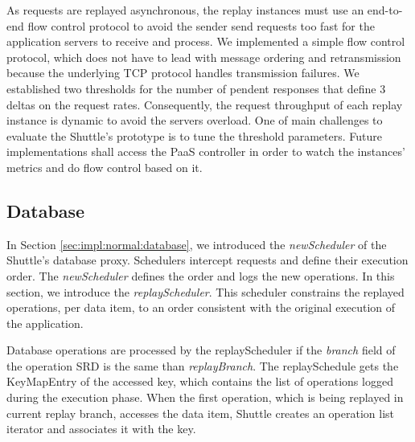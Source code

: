 


As requests are replayed asynchronous, the replay instances must use an end-to-end flow control protocol to avoid the sender send requests too fast for the application servers to receive and process. We implemented a simple flow control protocol, which does not have to lead with message ordering and retransmission because the underlying \ac{TCP} protocol handles transmission failures. We established two thresholds for the number of pendent responses that define 3 deltas on the request rates. Consequently, the request throughput of each replay instance is dynamic to avoid the servers overload. One of main challenges to evaluate the Shuttle's prototype is to tune the threshold parameters. Future implementations shall access the \ac{PaaS} controller in order to watch the instances' metrics and do flow control based on it.\\


\subsection{Database}\label{sec:impl:recovery:database}
In Section \ref{sec:impl:normal:database}, we introduced the \emph{newScheduler} of the Shuttle's database proxy. Schedulers intercept requests and define their execution order. The \emph{newScheduler} defines the order and logs the new operations. In this section, we introduce the \emph{replayScheduler}. This scheduler constrains the replayed operations, per data item, to an order consistent with the original execution of the application.

Database operations are processed by the replayScheduler if the \emph{branch} field of the operation \ac{SRD} is the same than \emph{replayBranch}. The replaySchedule gets the KeyMapEntry of the accessed key, which contains the list of operations logged during the execution phase. When the first operation, which is being replayed in current replay branch, accesses the data item, Shuttle creates an operation list iterator and associates it with the key.

